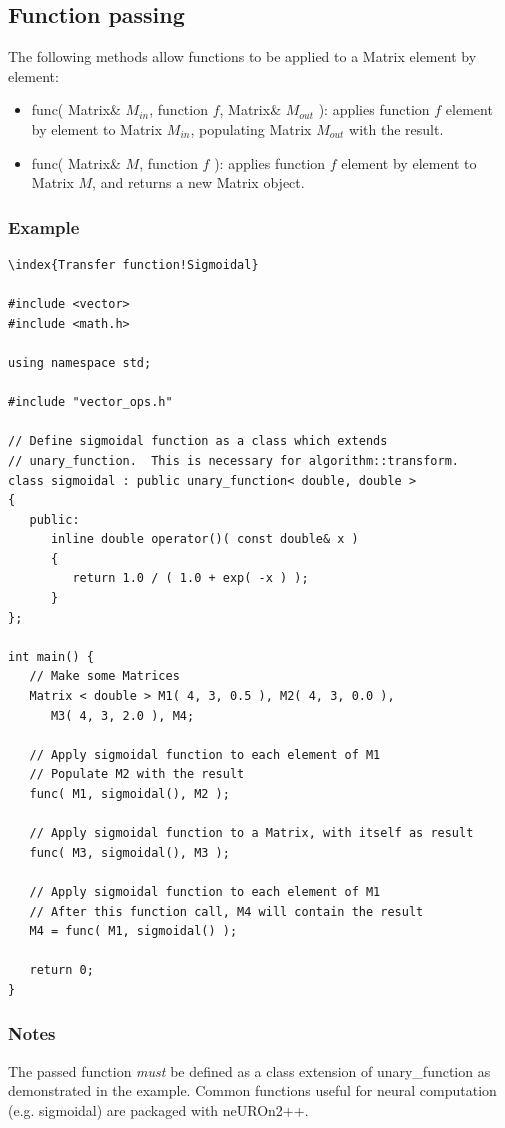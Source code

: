 \documentclass{report}
\begin{document}
\subsection{Function passing}

The following methods allow functions to be applied to a Matrix
element by element:

\begin{itemize}
\item func( Matrix\& $M_{in}$, function $f$, Matrix\& $M_{out}$ ):
      applies function $f$ element by element to Matrix $M_{in}$,
      populating Matrix $M_{out}$ with the result.
\item func( Matrix\& $M$, function $f$ ): applies function $f$ element
      by element to Matrix $M$, and returns a new Matrix object.
\end{itemize}

\subsubsection{Example}

\begin{verbatim}\index{Transfer function!Sigmoidal}

#include <vector>
#include <math.h>

using namespace std;

#include "vector_ops.h"

// Define sigmoidal function as a class which extends
// unary_function.  This is necessary for algorithm::transform.
class sigmoidal : public unary_function< double, double >
{
   public:
      inline double operator()( const double& x )
      {
         return 1.0 / ( 1.0 + exp( -x ) );
      }
};

int main() {
   // Make some Matrices
   Matrix < double > M1( 4, 3, 0.5 ), M2( 4, 3, 0.0 ),
      M3( 4, 3, 2.0 ), M4;

   // Apply sigmoidal function to each element of M1
   // Populate M2 with the result
   func( M1, sigmoidal(), M2 );

   // Apply sigmoidal function to a Matrix, with itself as result
   func( M3, sigmoidal(), M3 );

   // Apply sigmoidal function to each element of M1
   // After this function call, M4 will contain the result
   M4 = func( M1, sigmoidal() );

   return 0;
}
\end{verbatim}

\subsubsection{Notes}
The passed function {\em must} be defined as a class extension of
unary\_function as demonstrated in the example.  Common functions
useful for neural computation (e.g. sigmoidal) are packaged with
neUROn2++.
\end{document}

